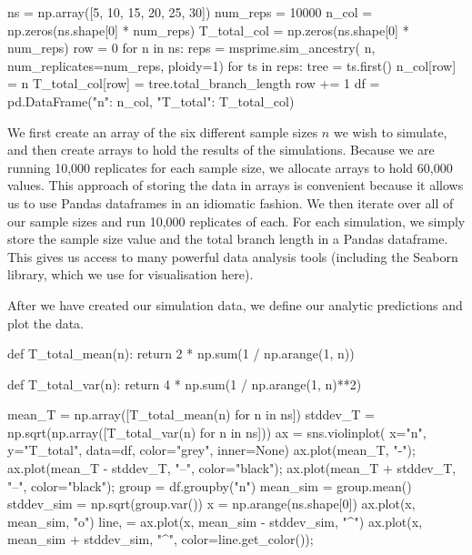 \documentclass[graybox]{svmult}
\begin{document}
\begin{pythoncode}
ns = np.array([5, 10, 15, 20, 25, 30])
num_reps = 10000
n_col = np.zeros(ns.shape[0] * num_reps)
T_total_col = np.zeros(ns.shape[0] * num_reps)
row = 0
for n in ns:
    reps = msprime.sim_ancestry(
        n, num_replicates=num_reps, ploidy=1)
    for ts in reps:
        tree = ts.first()
        n_col[row] = n
        T_total_col[row] = tree.total_branch_length
        row += 1
df = pd.DataFrame({"n": n_col, "T_total": T_total_col})
\end{pythoncode}

    We first create an array of the six different sample sizes \(n\) we wish to simulate, and then create arrays to hold the results of the
simulations. Because we are running 10,000 replicates for each sample
size, we allocate arrays to hold 60,000 values. This approach of storing
the data in arrays is convenient because it allows us to use Pandas
dataframes in an idiomatic fashion. We then iterate
over all of our sample sizes and run 10,000 replicates of each. For each
simulation, we simply store the sample size value and the total branch
length in a Pandas dataframe. This gives us access to many powerful data analysis tools (including the Seaborn library, which we use for visualisation here).

After we have created our simulation data, we define our analytic
predictions and plot the data.

\begin{pythoncode}
def T_total_mean(n):
    return 2 * np.sum(1 / np.arange(1, n))

def T_total_var(n):
    return 4 * np.sum(1 / np.arange(1, n)**2)

mean_T = np.array([T_total_mean(n) for n in ns])
stddev_T = np.sqrt(np.array([T_total_var(n) for n in ns]))
ax = sns.violinplot(
    x="n", y="T_total", data=df, color="grey", inner=None)
ax.plot(mean_T, "-");
ax.plot(mean_T - stddev_T, "--", color="black");
ax.plot(mean_T + stddev_T, "--", color="black");
group = df.groupby("n")
mean_sim = group.mean()
stddev_sim = np.sqrt(group.var())
x = np.arange(ns.shape[0])
ax.plot(x, mean_sim, "o")
line, = ax.plot(x, mean_sim - stddev_sim, "^")
ax.plot(x, mean_sim + stddev_sim, "^", color=line.get_color());
\end{pythoncode}
\end{document}
